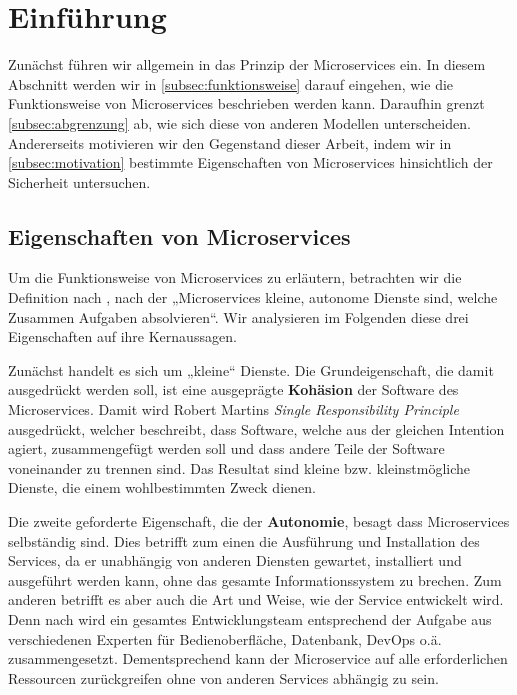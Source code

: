 \section{Einführung}
\label{sec:einführung}

Zunächst führen wir allgemein in das Prinzip der Microservices ein. In diesem Abschnitt werden wir in \autoref{subsec:funktionsweise} darauf eingehen, wie die Funktionsweise von Microservices beschrieben werden kann. Daraufhin grenzt \autoref{subsec:abgrenzung} ab, wie sich diese von anderen Modellen unterscheiden. Andererseits motivieren wir den Gegenstand dieser Arbeit, indem wir in \autoref{subsec:motivation} bestimmte Eigenschaften von Microservices hinsichtlich der Sicherheit untersuchen.

\subsection{Eigenschaften von Microservices}
\label{subsec:funktionsweise}

Um die Funktionsweise von Microservices zu erläutern, betrachten wir die Definition nach \cite{newman2015}, nach der „Microservices kleine, autonome Dienste sind, welche Zusammen Aufgaben absolvieren“. Wir analysieren im Folgenden diese drei Eigenschaften auf ihre Kernaussagen.

Zunächst handelt es sich um „kleine“ Dienste. Die Grundeigenschaft, die damit ausgedrückt werden soll, ist eine ausgeprägte \textbf{Kohäsion} der Software des Microservices. Damit wird Robert Martins \textit{Single Responsibility Principle} ausgedrückt, welcher beschreibt, dass Software, welche aus der gleichen Intention agiert, zusammengefügt werden soll und dass andere Teile der Software voneinander zu trennen sind. Das Resultat sind kleine bzw. kleinstmögliche Dienste, die einem wohlbestimmten Zweck dienen.

Die zweite geforderte Eigenschaft, die der \textbf{Autonomie}, besagt dass Microservices selbständig sind. Dies betrifft zum einen die Ausführung und Installation des Services, da er unabhängig von anderen Diensten gewartet, installiert und ausgeführt werden kann, ohne das gesamte Informationssystem zu brechen. Zum anderen betrifft es aber auch die Art und Weise, wie der Service entwickelt wird. Denn nach \cite{Fowler+14} wird ein gesamtes Entwicklungsteam entsprechend der Aufgabe aus verschiedenen Experten für Bedienoberfläche, Datenbank, DevOps o.ä. zusammengesetzt. Dementsprechend kann der Microservice auf alle erforderlichen Ressourcen zurückgreifen ohne von anderen Services abhängig zu sein.

